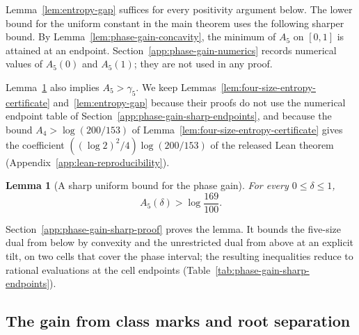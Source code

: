 \documentclass[a4paper,10pt,reqno]{amsart}
\numberwithin{equation}{section}
\theoremstyle{plain}
\newtheorem{lemma}[theorem]{Lemma}
\theoremstyle{remark}
\begin{document}
Lemma~\ref{lem:entropy-gap} suffices for every positivity argument below.
The lower bound for the uniform constant in the main theorem uses the
following sharper bound. By Lemma~\ref{lem:phase-gain-concavity}, the
minimum of $A_5$ on $[0,1]$ is attained at an endpoint.
Section~\ref{app:phase-gain-numerics} records numerical values of $A_5(0)$
and $A_5(1)$; they are not used in any proof.

Lemma~\ref{lem:phase-gain-sharp} also implies $A_5>\gamma_5$. We keep
Lemmas~\ref{lem:four-size-entropy-certificate} and~\ref{lem:entropy-gap}
because their proofs do not use the numerical endpoint table of
Section~\ref{app:phase-gain-sharp-endpoints}, and because the bound
$A_4>\log(200/153)$ of Lemma~\ref{lem:four-size-entropy-certificate} gives
the coefficient $((\log 2)^2/4)\log(200/153)$ of the released Lean theorem
(Appendix~\ref{app:lean-reproducibility}).

\begin{lemma}[A sharp uniform bound for the phase gain]
\label{lem:phase-gain-sharp}
For every $0\le\delta\le1$,
\[
 A_5(\delta)>\log\frac{169}{100}.
\]
\end{lemma}
Section~\ref{app:phase-gain-sharp-proof} proves the lemma. It bounds the
five-size dual from below by convexity and the unrestricted dual from above
at an explicit tilt, on two cells that cover the phase interval; the
resulting inequalities reduce to rational evaluations at the cell endpoints
(Table~\ref{tab:phase-gain-sharp-endpoints}).

\subsection{The gain from class marks and root separation}
\end{document}
